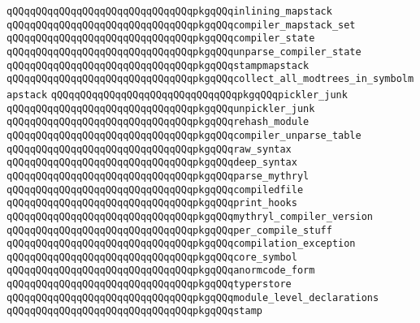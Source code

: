 \verb|qQQqqQQqqQQqqQQqqQQqqQQqqQQqqQQqpkgqQQqinlining_mapstack|\newline
\verb|qQQqqQQqqQQqqQQqqQQqqQQqqQQqqQQqpkgqQQqcompiler_mapstack_set|\newline
\verb|qQQqqQQqqQQqqQQqqQQqqQQqqQQqqQQqpkgqQQqcompiler_state|\newline
\verb|qQQqqQQqqQQqqQQqqQQqqQQqqQQqqQQqpkgqQQqunparse_compiler_state|\newline
\verb|qQQqqQQqqQQqqQQqqQQqqQQqqQQqqQQqpkgqQQqstampmapstack|\newline
\verb|qQQqqQQqqQQqqQQqqQQqqQQqqQQqqQQqpkgqQQqcollect_all_modtrees_in_symbolmapstack|\newline
\verb|qQQqqQQqqQQqqQQqqQQqqQQqqQQqqQQqpkgqQQqpickler_junk|\newline
\verb|qQQqqQQqqQQqqQQqqQQqqQQqqQQqqQQqpkgqQQqunpickler_junk|\newline
\verb|qQQqqQQqqQQqqQQqqQQqqQQqqQQqqQQqpkgqQQqrehash_module|\newline
\verb|qQQqqQQqqQQqqQQqqQQqqQQqqQQqqQQqpkgqQQqcompiler_unparse_table|\newline
\verb|qQQqqQQqqQQqqQQqqQQqqQQqqQQqqQQqpkgqQQqraw_syntax|\newline
\verb|qQQqqQQqqQQqqQQqqQQqqQQqqQQqqQQqpkgqQQqdeep_syntax|\newline
\verb|qQQqqQQqqQQqqQQqqQQqqQQqqQQqqQQqpkgqQQqparse_mythryl|\newline
\verb|qQQqqQQqqQQqqQQqqQQqqQQqqQQqqQQqpkgqQQqcompiledfile|\newline
\verb|qQQqqQQqqQQqqQQqqQQqqQQqqQQqqQQqpkgqQQqprint_hooks|\newline
\verb|qQQqqQQqqQQqqQQqqQQqqQQqqQQqqQQqpkgqQQqmythryl_compiler_version|\newline
\verb|qQQqqQQqqQQqqQQqqQQqqQQqqQQqqQQqpkgqQQqper_compile_stuff|\newline
\verb|qQQqqQQqqQQqqQQqqQQqqQQqqQQqqQQqpkgqQQqcompilation_exception|\newline
\verb|qQQqqQQqqQQqqQQqqQQqqQQqqQQqqQQqpkgqQQqcore_symbol|\newline
\verb|qQQqqQQqqQQqqQQqqQQqqQQqqQQqqQQqpkgqQQqanormcode_form|\newline
\newline
\verb|qQQqqQQqqQQqqQQqqQQqqQQqqQQqqQQqpkgqQQqtyperstore|\newline
\verb|qQQqqQQqqQQqqQQqqQQqqQQqqQQqqQQqpkgqQQqmodule_level_declarations|\newline
\verb|qQQqqQQqqQQqqQQqqQQqqQQqqQQqqQQqpkgqQQqstamp|\newline
